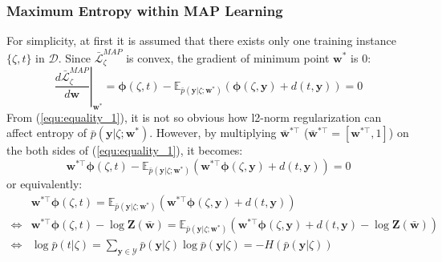 \subsubsection{Maximum Entropy within MAP Learning}
For simplicity, at first it is assumed that there exists only one training instance $\{\zeta,t\}$ in $\mathcal{D}$.  
Since $\bar{\mathcal{L}}^{MAP}_\zeta$ is convex, the gradient of minimum point $\mathbf{w}^*$ is 0: 
\begin{equation}
    \left.\frac{d \bar{\mathcal{L}}^{MAP}_\zeta}{d \mathbf{w}}\right|_{\mathbf{w}^*}=\boldsymbol{\phi}(\zeta, t)-\mathbb{E}_{\bar p(\mathbf{y}|\zeta;\mathbf{w}^*)} \left(\boldsymbol{\phi}(\zeta,\mathbf{y})+d(t,\mathbf{y})\right)=0
    \label{equ:equality_1}
\end{equation}
From (\ref{equ:equality_1}), it is not so obvious how l2-norm regularization can affect entropy of $\bar p(\mathbf{y}|\zeta;\mathbf{w}^*)$.    
However, by multiplying $\bar{\mathbf{w}}^{*\top}$ ($\bar{\mathbf{w}}^{*\top}=[\mathbf{w}^{*\top},1]$) on the both sides of (\ref{equ:equality_1}), it becomes: 
\begin{equation}
    \mathbf{w}^{*\top}\boldsymbol{\phi}(\zeta, t)-\mathbb{E}_{\bar p(\mathbf{y}|\zeta; \mathbf{w}^*)} \left(\mathbf{w}^{*\top} \boldsymbol{\phi}(\zeta,\mathbf{y})+d(t,\mathbf{y})\right)=0 
\end{equation}
or equivalently:
\begin{equation}
    \begin{array}{ll}
                   & \mathbf{w}^{*\top}\boldsymbol{\phi}(\zeta, t)=\mathbb{E}_{\bar p(\mathbf{y}|\zeta; \mathbf{w}^*)} \left(\mathbf{w}^{*\top}\boldsymbol{\phi}(\zeta,\mathbf{y})+d(t,\mathbf{y})\right)\\ 
    \Leftrightarrow& \mathbf{w}^{*\top}\boldsymbol{\phi}(\zeta, t)-\log \mathbf{Z}(\bar{\mathbf{w}})= \mathbb{E}_{\bar p(\mathbf{y}|\zeta; \mathbf{w}^*)}(\mathbf{w}^{*\top} \boldsymbol{\phi}(\zeta,\mathbf{y})+d(t,\mathbf{y})-\log \mathbf{Z}(\bar{\mathbf{w}})) \\ 
    \Leftrightarrow& \log \bar p(t|\zeta) = \sum_{\mathbf{y}\in\mathcal{Y}} \bar p(\mathbf{y}|\zeta)\log \bar p(\mathbf{y}|\zeta)=-H(\bar p(\mathbf{y}|\zeta)) 
    \end{array}
    \label{equ:entropy}
\end{equation}
